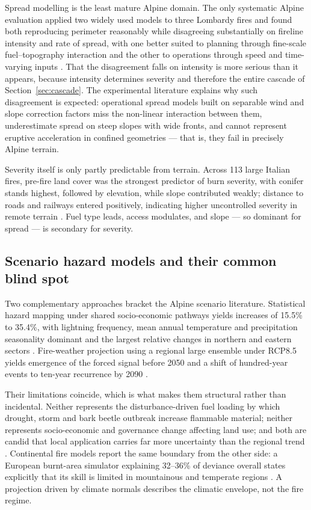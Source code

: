 \documentclass[11pt,a4paper]{article}
\begin{document}
Spread modelling is the least mature Alpine domain. The only systematic Alpine evaluation applied two widely used models to three Lombardy fires and found both reproducing perimeter reasonably while disagreeing substantially on fireline intensity and rate of spread, with one better suited to planning through fine-scale fuel--topography interaction and the other to operations through speed and time-varying inputs \citep{malanchini_modeling_2025}. That the disagreement falls on intensity is more serious than it appears, because intensity determines severity and therefore the entire cascade of Section~\ref{sec:cascade}. The experimental literature explains why such disagreement is expected: operational spread models built on separable wind and slope correction factors miss the non-linear interaction between them, underestimate spread on steep slopes with wide fronts, and cannot represent eruptive acceleration in confined geometries \citep{hayajneh_wind_2026} --- that is, they fail in precisely Alpine terrain.

Severity itself is only partly predictable from terrain. Across 113 large Italian fires, pre-fire land cover was the strongest predictor of burn severity, with conifer stands highest, followed by elevation, while slope contributed weakly; distance to roads and railways entered positively, indicating higher uncontrolled severity in remote terrain \citep{malandra_burn_2022}. Fuel type leads, access modulates, and slope --- so dominant for spread --- is secondary for severity.

\subsection{Scenario hazard models and their common blind spot}

Two complementary approaches bracket the Alpine scenario literature. Statistical hazard mapping under shared socio-economic pathways yields increases of 15.5\% to 35.4\%, with lightning frequency, mean annual temperature and precipitation seasonality dominant and the largest relative changes in northern and eastern sectors \citep{gerberding_mapping_2025}. Fire-weather projection using a regional large ensemble under RCP8.5 yields emergence of the forced signal before 2050 and a shift of hundred-year events to ten-year recurrence by 2090 \citep{miller_climate_2024}.

Their limitations coincide, which is what makes them structural rather than incidental. Neither represents the disturbance-driven fuel loading by which drought, storm and bark beetle outbreak increase flammable material; neither represents socio-economic and governance change affecting land use; and both are candid that local application carries far more uncertainty than the regional trend \citep{gerberding_mapping_2025}. Continental fire models report the same boundary from the other side: a European burnt-area simulator explaining 32--36\% of deviance overall states explicitly that its skill is limited in mountainous and temperate regions \citep{forrest_understanding_2024}. A projection driven by climate normals describes the climatic envelope, not the fire regime.
\end{document}
